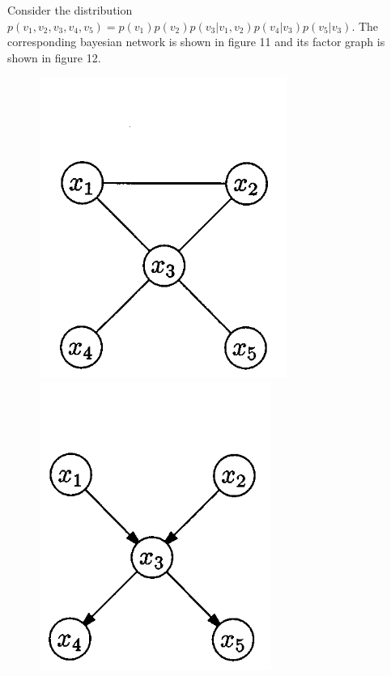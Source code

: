 \documentclass[letterpaper,english,10pt]{article}
\begin{document}
\begin{exmp}
Consider the distribution $p(v_1,v_2,v_3,v_4,v_5) = p(v_1)p(v_2)p(v_3|v_1,v_2)p(v_4|v_3)p(v_5|v_3)$. The corresponding bayesian network
is shown in figure 11 and its factor graph is shown in figure 12.
\end{exmp}
\begin{figure}[htb]
\centering
\begin{minipage}[t]{.33\textwidth}
  \centering
  \includegraphics[width=.6\linewidth]{exmpl_9_pic_1.png}
\end{minipage}%
\begin{minipage}[t]{.33\textwidth}
  \centering
  \includegraphics[width=.6\linewidth]{exmpl_9_pic_2.png}

\end{minipage}
\end{figure}
\end{document}
